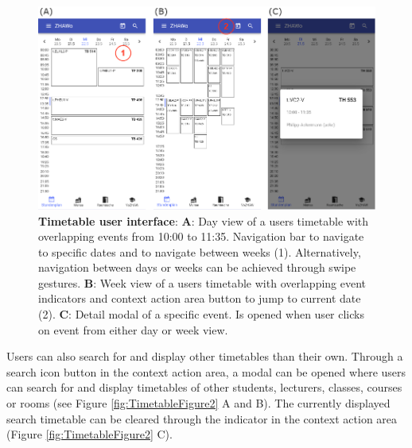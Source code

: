 \begin{markdown}
\begin{figure}[H]
  \includegraphics[width=16cm, center]{./figures/timetable_figure1.png}
  \captionsetup{width=15.5cm}
  \caption[Timetable user interface]{\textbf{Timetable user interface}: \textbf{A}: Day view of a users timetable with overlapping events from 10:00 to 11:35. Navigation bar to navigate to specific dates and to navigate between weeks (1). Alternatively, navigation between days or weeks can be achieved through swipe gestures. \textbf{B}: Week view of a users timetable with overlapping event indicators and context action area button to jump to current date (2). \textbf{C}: Detail modal of a specific event. Is opened when user clicks on event from either day or week view.}
  \label{fig:TimetableFigure1}
\end{figure}

Users can also search for and display other timetables than their own. Through a search icon button in the context action area, a modal can be opened where users can search for and display timetables of other students, lecturers, classes, courses or rooms (see Figure \ref{fig:TimetableFigure2} A and B). The currently displayed search timetable can be cleared through the indicator in the context action area (Figure \ref{fig:TimetableFigure2} C).


\end{markdown}
